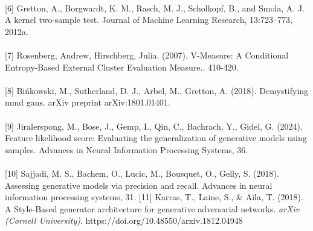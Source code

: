 \documentclass{article}
\begin{document}
\paragraph{}
\label{sec: ref6} [6] Gretton, A., Borgwardt, K. M., Rasch, M. J., Scholkopf, B., and Smola, A. J. A kernel two-sample test. Journal of Machine Learning Research, 13:723–773, 2012a.
\paragraph{}
\label{sec: ref7} [7] Rosenberg, Andrew, Hirschberg, Julia. (2007). V-Measure: A Conditional Entropy-Based External Cluster Evaluation Measure.. 410-420. 
\paragraph{}
\label{sec: ref8} [8] Bińkowski, M., Sutherland, D. J., Arbel, M., Gretton, A. (2018). Demystifying mmd gans. arXiv preprint arXiv:1801.01401.
\paragraph{}
\label{sec: ref9} [9] Jiralerspong, M., Bose, J., Gemp, I., Qin, C., Bachrach, Y., Gidel, G. (2024). Feature likelihood score: Evaluating the generalization of generative models using samples. Advances in Neural Information Processing Systems, 36.
\paragraph{}
\label{sec: ref10} [10] Sajjadi, M. S., Bachem, O., Lucic, M., Bousquet, O.,  Gelly, S. (2018). Assessing generative models via precision and recall. Advances in neural information processing systems, 31.
\label{sec: ref11} [11] Karras, T., Laine, S., \& Aila, T. (2018). A Style-Based generator architecture for generative adversarial networks. \textit{arXiv (Cornell University)}. https://doi.org/10.48550/arxiv.1812.04948
\end{document}
